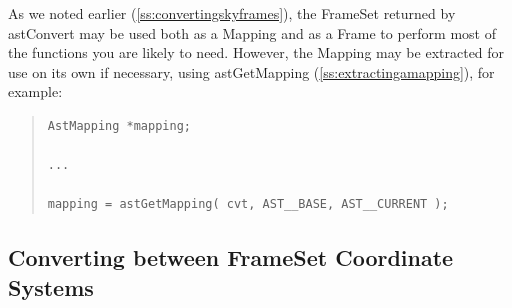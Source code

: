 \documentclass[twoside,11pt]{article}
\newcommand{\htmlref}[2]{#1}
\newcommand{\secref}[1]{\S\ref{#1}}
\renewcommand{\secref}[1]{\ref{#1}}
\begin{document}
As we noted earlier (\secref{ss:convertingskyframes}), the FrameSet
returned by astConvert may be used both as a Mapping and as a Frame to
perform most of the functions you are likely to need. However, the
Mapping may be extracted for use on its own if necessary, using
\htmlref{astGetMapping}{astGetMapping} (\secref{ss:extractingamapping}), for example:

\begin{quote}
\small
\begin{verbatim}
AstMapping *mapping;

...

mapping = astGetMapping( cvt, AST__BASE, AST__CURRENT );
\end{verbatim}
\normalsize
\end{quote}

\subsection{\label{ss:framesetconverting}Converting between FrameSet Coordinate Systems}
\end{document}
